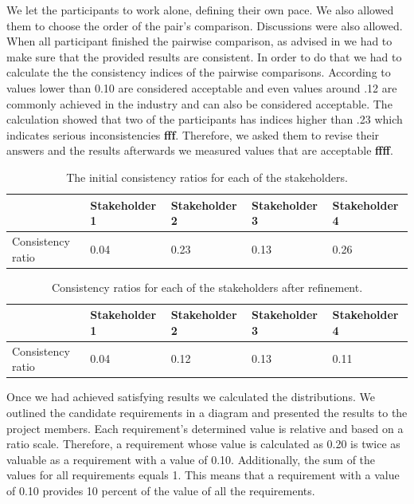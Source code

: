 We let the participants to work alone, defining their own pace. We also allowed them to choose the order of the pair's comparison. Discussions were also allowed. When all participant finished the pairwise comparison, as advised in \cite{Karlsson} we had to make sure that the provided results are consistent. In order to do that we had to calculate the the consistency indices of the pairwise comparisons. According to \cite{Karlsson} values lower than 0.10 are considered acceptable and even values around .12 are commonly achieved in the industry and can also be considered acceptable. The calculation showed that two of the participants has indices higher than .23 which indicates serious inconsistencies \textbf{fff}. Therefore, we asked them to revise their answers and the results afterwards we measured values that are acceptable \textbf{ffff}.
 
 \begin{table}[h!]
  \begin{center}
    \begin{tabular}{| l | l | l | l | l |}
    \hline
    & Stakeholder 1 & Stakeholder 2 & Stakeholder 3 & Stakeholder 4 \\	 \hline
    Consistency ratio & 0.04 & 0.23 & 0.13 & 0.26 \\
    \hline
    \end{tabular}
  \end{center}
  \caption{The initial consistency ratios for each of the stakeholders.}
\end{table}


 \begin{table}[h!]
  \begin{center}
    \begin{tabular}{| l | l | l | l | l |}
    \hline
    & Stakeholder 1 & Stakeholder 2 & Stakeholder 3 & Stakeholder 4 \\	 \hline
    Consistency ratio & 0.04 & 0.12 & 0.13 & 0.11 \\
    \hline
    \end{tabular}
  \end{center}
  \caption{Consistency ratios for each of the stakeholders after refinement.}
\end{table}

Once we had achieved satisfying results we calculated the distributions. We outlined the candidate requirements in a diagram and presented the results to the project members. Each requirement's determined value is relative and based on a ratio scale. Therefore, a requirement whose value is calculated as 0.20 is twice as valuable as a requirement with a value of 0.10. Additionally, the sum of the values for all requirements equals 1. This means that a requirement with a value of 0.10 provides 10 percent of the value of all the requirements.

